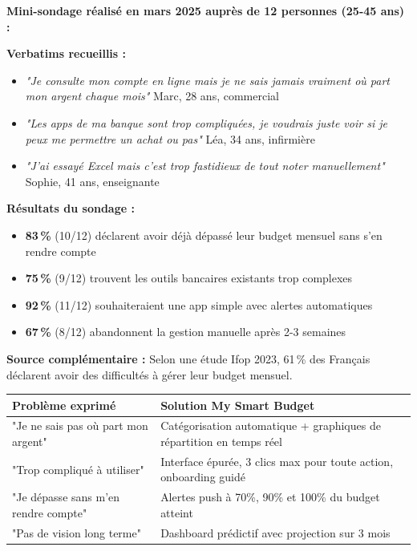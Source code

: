 \begin{tcolorbox}[colback=yellow!5!white,colframe=yellow!60!black,title=\textbf{Validation terrain -- Étude préliminaire auprès de 12 utilisateurs}]
\textbf{Mini-sondage réalisé en mars 2025 auprès de 12 personnes (25-45 ans) :}

\textbf{Verbatims recueillis :}
\begin{itemize}
    \item[\textbullet] \textit{"Je consulte mon compte en ligne mais je ne sais jamais vraiment où part mon argent chaque mois"}  Marc, 28 ans, commercial
    \item[\textbullet] \textit{"Les apps de ma banque sont trop compliquées, je voudrais juste voir si je peux me permettre un achat ou pas"}  Léa, 34 ans, infirmière
    \item[\textbullet] \textit{"J'ai essayé Excel mais c'est trop fastidieux de tout noter manuellement"}  Sophie, 41 ans, enseignante
\end{itemize}

\textbf{Résultats du sondage :}
\begin{itemize}
    \item \textbf{83\,\%} (10/12) déclarent avoir déjà dépassé leur budget mensuel sans s'en rendre compte
    \item \textbf{75\,\%} (9/12) trouvent les outils bancaires existants trop complexes
    \item \textbf{92\,\%} (11/12) souhaiteraient une app simple avec alertes automatiques
    \item \textbf{67\,\%} (8/12) abandonnent la gestion manuelle après 2-3 semaines
\end{itemize}

\textbf{Source complémentaire :} Selon une étude Ifop 2023, 61\,\% des Français déclarent avoir des difficultés à gérer leur budget mensuel.
\end{tcolorbox}

\begin{tcolorbox}[colback=green!5!white,colframe=green!60!black,title=\textbf{Réponse de My Smart Budget aux problèmes identifiés}]
\begin{tabular}{|p{6cm}|p{8cm}|}
\hline
\textbf{Problème exprimé} & \textbf{Solution My Smart Budget} \\
\hline
"Je ne sais pas où part mon argent" & Catégorisation automatique + graphiques de répartition en temps réel \\
\hline
"Trop compliqué à utiliser" & Interface épurée, 3 clics max pour toute action, onboarding guidé \\
\hline
"Je dépasse sans m'en rendre compte" & Alertes push à 70\%, 90\% et 100\% du budget atteint \\
\hline
"Pas de vision long terme" & Dashboard prédictif avec projection sur 3 mois \\
\hline
\end{tabular}
\end{tcolorbox}

